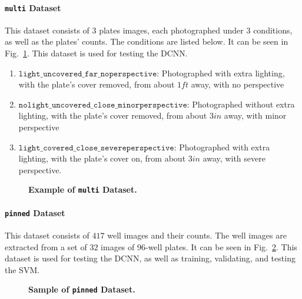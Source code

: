 \documentclass[10pt,letterpaper]{article}
\begin{document}
        \paragraph*{\texttt{multi} Dataset}
            This dataset consists of $3$ plates images, each photographed under $3$ conditions, as well as the plates' counts. The conditions are listed below. It can be seen in Fig.~\ref{multi}. This dataset is used for testing the DCNN.

            \begin{enumerate}
                \item $\texttt{light\_uncovered\_far\_noperspective}$: Photographed with extra lighting, with the plate's cover removed, from about $1ft$ away, with no perspective
                \item $\texttt{nolight\_uncovered\_close\_minorperspective}$: Photographed without extra lighting, with the plate's cover removed, from about $3in$ away, with minor perspective
                \item $\texttt{light\_covered\_close\_severeperspective}$: Photographed with extra lighting, with the plate's cover on, from about $3in$ away, with severe perspective.
            \end{enumerate}
            
            \begin{figure}[h]
                
                \caption{{\bf Example of \texttt{multi} Dataset.}}
                \label{multi}
            \end{figure}

        \paragraph*{\texttt{pinned} Dataset}    
            This dataset consists of $417$ well images and their counts. The well images are extracted from a set of $32$ images of 96-well plates. It can be seen in Fig.~\ref{pinned}. This dataset is used for testing the DCNN, as well as training, validating, and testing the SVM.
            
            \begin{figure}[h]
                
                \caption{{\bf Sample of \texttt{pinned} Dataset.}}
                \label{pinned}
            \end{figure}
\end{document}
